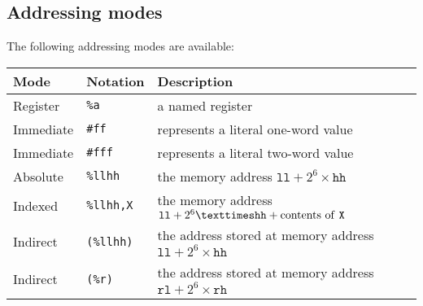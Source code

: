 \documentclass[a5paper,onecolumn,final,10pt]{memoir}
\let\ttt\texttt
\begin{document}
\subsection*{Addressing modes}

The following addressing modes are available:


\begin{center}
\begin{tabular}{|l|l|l|}
	\hline
	\textbf{Mode} & \textbf{Notation} & \textbf{Description} \\ \hline
	Register  & \ttt{\%a} & a named register \\ \hline
	Immediate & \ttt{\#ff} & represents a literal one-word value \\ \hline
	Immediate & \ttt{\#fff} & represents a literal two-word value \\ \hline
	Absolute  & \ttt{\%llhh} & the memory address $\ttt{ll}+2^6×\ttt{hh}$ \\ \hline
	Indexed   & \ttt{\%llhh,X} & the memory address $\ttt{ll}+2^6×\ttt{hh}+\textrm{contents of \ttt{X}}$ \\ \hline
	Indirect  & \hspace{-0.2em}\ttt{(\%llhh)} & the address stored at memory address $\ttt{ll}+2^6×\ttt{hh}$  \\ \hline
	Indirect  & \hspace{-0.2em}\ttt{(\%r)} & the address stored at memory address $\ttt{rl}+2^6×\ttt{rh}$\footnotemark \\ \hline
\end{tabular}
\end{center}
\end{document}
